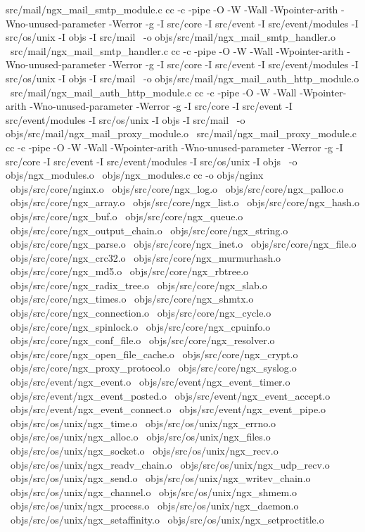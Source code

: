 	src/mail/ngx_mail_smtp_module.c
cc -c -pipe  -O -W -Wall -Wpointer-arith -Wno-unused-parameter -Werror -g  -I src/core -I src/event -I src/event/modules -I src/os/unix -I objs -I src/mail \
	-o objs/src/mail/ngx_mail_smtp_handler.o \
	src/mail/ngx_mail_smtp_handler.c
cc -c -pipe  -O -W -Wall -Wpointer-arith -Wno-unused-parameter -Werror -g  -I src/core -I src/event -I src/event/modules -I src/os/unix -I objs -I src/mail \
	-o objs/src/mail/ngx_mail_auth_http_module.o \
	src/mail/ngx_mail_auth_http_module.c
cc -c -pipe  -O -W -Wall -Wpointer-arith -Wno-unused-parameter -Werror -g  -I src/core -I src/event -I src/event/modules -I src/os/unix -I objs -I src/mail \
	-o objs/src/mail/ngx_mail_proxy_module.o \
	src/mail/ngx_mail_proxy_module.c
cc -c -pipe  -O -W -Wall -Wpointer-arith -Wno-unused-parameter -Werror -g  -I src/core -I src/event -I src/event/modules -I src/os/unix -I objs \
	-o objs/ngx_modules.o \
	objs/ngx_modules.c
cc -o objs/nginx \
objs/src/core/nginx.o \
objs/src/core/ngx_log.o \
objs/src/core/ngx_palloc.o \
objs/src/core/ngx_array.o \
objs/src/core/ngx_list.o \
objs/src/core/ngx_hash.o \
objs/src/core/ngx_buf.o \
objs/src/core/ngx_queue.o \
objs/src/core/ngx_output_chain.o \
objs/src/core/ngx_string.o \
objs/src/core/ngx_parse.o \
objs/src/core/ngx_inet.o \
objs/src/core/ngx_file.o \
objs/src/core/ngx_crc32.o \
objs/src/core/ngx_murmurhash.o \
objs/src/core/ngx_md5.o \
objs/src/core/ngx_rbtree.o \
objs/src/core/ngx_radix_tree.o \
objs/src/core/ngx_slab.o \
objs/src/core/ngx_times.o \
objs/src/core/ngx_shmtx.o \
objs/src/core/ngx_connection.o \
objs/src/core/ngx_cycle.o \
objs/src/core/ngx_spinlock.o \
objs/src/core/ngx_cpuinfo.o \
objs/src/core/ngx_conf_file.o \
objs/src/core/ngx_resolver.o \
objs/src/core/ngx_open_file_cache.o \
objs/src/core/ngx_crypt.o \
objs/src/core/ngx_proxy_protocol.o \
objs/src/core/ngx_syslog.o \
objs/src/event/ngx_event.o \
objs/src/event/ngx_event_timer.o \
objs/src/event/ngx_event_posted.o \
objs/src/event/ngx_event_accept.o \
objs/src/event/ngx_event_connect.o \
objs/src/event/ngx_event_pipe.o \
objs/src/os/unix/ngx_time.o \
objs/src/os/unix/ngx_errno.o \
objs/src/os/unix/ngx_alloc.o \
objs/src/os/unix/ngx_files.o \
objs/src/os/unix/ngx_socket.o \
objs/src/os/unix/ngx_recv.o \
objs/src/os/unix/ngx_readv_chain.o \
objs/src/os/unix/ngx_udp_recv.o \
objs/src/os/unix/ngx_send.o \
objs/src/os/unix/ngx_writev_chain.o \
objs/src/os/unix/ngx_channel.o \
objs/src/os/unix/ngx_shmem.o \
objs/src/os/unix/ngx_process.o \
objs/src/os/unix/ngx_daemon.o \
objs/src/os/unix/ngx_setaffinity.o \
objs/src/os/unix/ngx_setproctitle.o \
